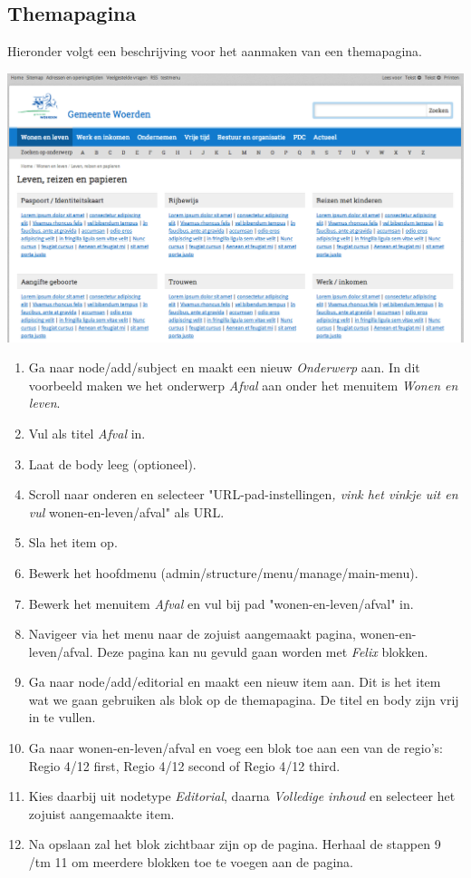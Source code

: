 \subsection{Themapagina}\label{themapagina}

Hieronder volgt een beschrijving voor het aanmaken van een themapagina.

\begin{center}
	\includegraphics[width=\textwidth]{img/themapagina.png}
\end{center}

\begin{enumerate}
\item Ga naar node/add/subject en maakt een nieuw \emph{Onderwerp} aan. In dit voorbeeld maken we het onderwerp \emph{Afval} aan onder het menuitem \emph{Wonen en leven}.
\item Vul als titel \emph{Afval} in.
\item Laat de body leeg (optioneel).
\item Scroll naar onderen en selecteer "URL-pad-instellingen\emph{, vink het vinkje uit en vul }wonen-en-leven/afval" als URL.
\item Sla het item op.
\item Bewerk het hoofdmenu (admin/structure/menu/manage/main-menu).
\item Bewerk het menuitem \emph{Afval} en vul bij pad "wonen-en-leven/afval" in.
\item Navigeer via het menu naar de zojuist aangemaakt pagina, wonen-en-leven/afval. Deze pagina kan nu gevuld gaan worden met \emph{Felix} blokken.
\item Ga naar node/add/editorial en maakt een nieuw item aan. Dit is het item wat we gaan gebruiken als blok op de themapagina. De titel en body zijn vrij in te vullen.
\item Ga naar wonen-en-leven/afval en voeg een blok toe aan een van de regio's: Regio 4/12 first, Regio 4/12 second of Regio 4/12 third.
\item Kies daarbij uit nodetype \emph{Editorial}, daarna \emph{Volledige inhoud} en selecteer het zojuist aangemaakte item.
\item Na opslaan zal het blok zichtbaar zijn op de pagina. Herhaal de stappen 9 /tm 11 om meerdere blokken toe te voegen aan de pagina.
\end{enumerate}